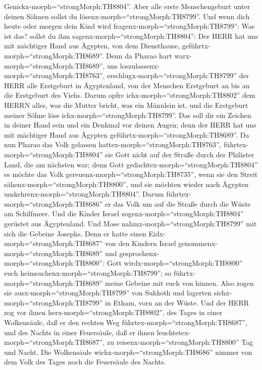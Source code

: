 Genickx-morph=``strongMorph:TH8804''. Aber alle erste Menschengeburt
unter deinen Söhnen sollst du lösenx-morph=``strongMorph:TH8799''.
 Und wenn dich heute oder morgen dein Kind wird
fragenx-morph=``strongMorph:TH8799'': Was ist das? sollst du ihm
sagenx-morph=``strongMorph:TH8804'': Der HERR hat uns mit mächtiger Hand
aus Ägypten, von dem Diensthause, geführtx-morph=``strongMorph:TH8689''.
 Denn da Pharao hart warx-morph=``strongMorph:TH8689'', uns
loszulassenx-morph=``strongMorph:TH8763'',
erschlugx-morph=``strongMorph:TH8799'' der HERR alle Erstgeburt in
Ägyptenland, von der Menschen Erstgeburt an bis an die Erstgeburt des
Viehs. Darum opfre ichx-morph=``strongMorph:TH8802'' dem HERRN alles,
was die Mutter bricht, was ein Männlein ist, und die Erstgeburt meiner
Söhne löse ichx-morph=``strongMorph:TH8799''.  Das soll dir
ein Zeichen in deiner Hand sein und ein Denkmal vor deinen Augen; denn
der HERR hat uns mit mächtiger Hand aus Ägypten
geführtx-morph=``strongMorph:TH8689''.  Da nun Pharao das
Volk gelassen hattex-morph=``strongMorph:TH8763'',
führtex-morph=``strongMorph:TH8804'' sie Gott nicht auf der Straße durch
der Philister Land, die am nächsten war; denn Gott
gedachtex-morph=``strongMorph:TH8804'' es möchte das Volk
gereuenx-morph=``strongMorph:TH8735'', wenn sie den Streit
sähenx-morph=``strongMorph:TH8800'', und sie möchten wieder nach Ägypten
umkehrenx-morph=``strongMorph:TH8804''.  Darum
führtex-morph=``strongMorph:TH8686'' er das Volk um auf die Straße durch
die Wüste am Schilfmeer. Und die Kinder Israel
zogenx-morph=``strongMorph:TH8804'' gerüstet aus Ägyptenland.
 Und Mose nahmx-morph=``strongMorph:TH8799'' mit sich die
Gebeine Josephs. Denn er hatte einen Eidx-morph=``strongMorph:TH8687''
von den Kindern Israel genommenx-morph=``strongMorph:TH8689'' und
gesprochenx-morph=``strongMorph:TH8800'': Gott
wirdx-morph=``strongMorph:TH8800'' euch
heimsuchenx-morph=``strongMorph:TH8799''; so
führtx-morph=``strongMorph:TH8689'' meine Gebeine mit euch von hinnen.
 Also zogen sie ausx-morph=``strongMorph:TH8799'' von
Sukkoth und lagerten sichx-morph=``strongMorph:TH8799'' in Etham, vorn
an der Wüste.  Und der HERR zog vor ihnen
herx-morph=``strongMorph:TH8802'', des Tages in einer Wolkensäule, daß
er den rechten Weg führtex-morph=``strongMorph:TH8687'', und des Nachts
in einer Feuersäule, daß er ihnen
leuchtetex-morph=``strongMorph:TH8687'', zu
reisenx-morph=``strongMorph:TH8800'' Tag und Nacht.  Die
Wolkensäule wichx-morph=``strongMorph:TH8686'' nimmer von dem Volk des
Tages noch die Feuersäule des Nachts.

